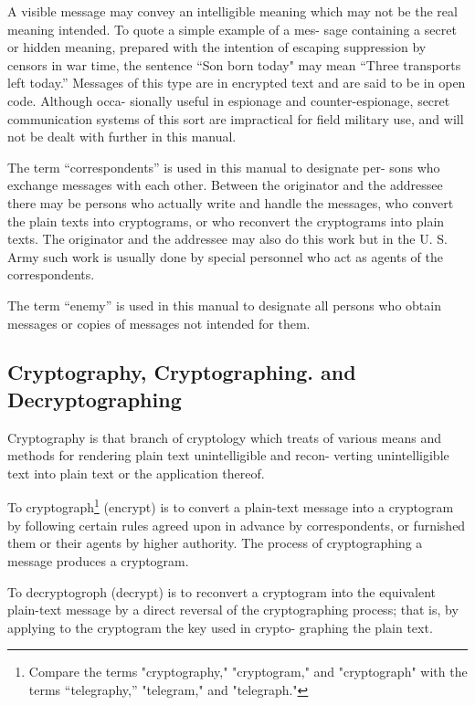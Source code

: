 \mypara A visible message may convey an intelligible meaning which may
not be the real meaning intended. To quote a simple example of a mes-
sage containing a secret or hidden meaning, prepared with the intention
of escaping suppression by censors in war time, the sentence “Son born
today" may mean “Three transports left today.” Messages of this type
are in encrypted text and are said to be in open code. Although occa-
sionally useful in espionage and counter-espionage, secret communication
systems of this sort are impractical for ﬁeld military use, and will not
be dealt with further in this manual.

\mypara The term “correspondents” is used in this manual to designate per-
sons who exchange messages with each other. Between the originator
and the addressee there may be persons who actually write and handle
the messages, who convert the plain texts into cryptograms, or who
reconvert the cryptograms into plain texts. The originator and the
addressee may also do this work but in the U. S. Army such work is
usually done by special personnel who act as agents of the correspondents.

\mypara The term “enemy” is used in this manual to designate all persons
who obtain messages or copies of messages not intended for them.

\subsection{Cryptography, Cryptographing. and Decryptographing}

\mypara Cryptography is that branch of cryptology which treats of various
means and methods for rendering plain text unintelligible and recon-
verting unintelligible text into plain text or the application thereof.

\mypara To cryptograph\footnote{ Compare the terms "cryptography," "cryptogram," and "cryptograph" with the terms “telegraphy,” "telegram," and "telegraph."} (encrypt) is to convert a plain-text message into
a cryptogram by following certain rules agreed upon in advance by
correspondents, or furnished them or their agents by higher authority.
The process of cryptographing a message produces a cryptogram.

\mypara To decryptogroph (decrypt) is to reconvert a cryptogram into the
equivalent plain-text message by a direct reversal of the cryptographing
process; that is, by applying to the cryptogram the key used in crypto-
graphing the plain text.

